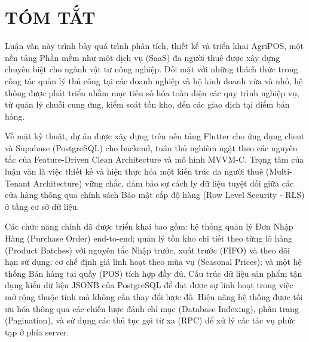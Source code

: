 \documentclass[13pt, a4paper]{report}
\begin{document}
\clearpage
{}






\clearpage
{}
{}
\tableofcontents



\clearpage
{}
{}
\listoffigures %
 


\clearpage
{}
{}
\listoftables %

 



\clearpage
\chapter*{TÓM TẮT}
Luận văn này trình bày quá trình phân tích, thiết kế và triển khai AgriPOS, một nền tảng Phần mềm như một dịch vụ (SaaS) đa người thuê được xây dựng chuyên biệt cho ngành vật tư nông nghiệp. Đối mặt với những thách thức trong công tác quản lý thủ công tại các doanh nghiệp và hộ kinh doanh vừa và nhỏ, hệ thống được phát triển nhằm mục tiêu số hóa toàn diện các quy trình nghiệp vụ, từ quản lý chuỗi cung ứng, kiểm soát tồn kho, đến các giao dịch tại điểm bán hàng.

Về mặt kỹ thuật, dự án được xây dựng trên nền tảng Flutter cho ứng dụng client và Supabase (PostgreSQL) cho backend, tuân thủ nghiêm ngặt theo các nguyên tắc của Feature-Driven Clean Architecture và mô hình MVVM-C. Trọng tâm của luận văn là việc thiết kế và hiện thực hóa một kiến trúc đa người thuê (Multi-Tenant Architecture) vững chắc, đảm bảo sự cách ly dữ liệu tuyệt đối giữa các cửa hàng thông qua chính sách Bảo mật cấp độ hàng (Row Level Security - RLS) ở tầng cơ sở dữ liệu.

Các chức năng chính đã được triển khai bao gồm: hệ thống quản lý Đơn Nhập Hàng (Purchase Order) end-to-end; quản lý tồn kho chi tiết theo từng lô hàng (Product Batches) với nguyên tắc Nhập trước, xuất trước (FIFO) và theo dõi hạn sử dụng; cơ chế định giá linh hoạt theo mùa vụ (Seasonal Prices); và một hệ thống Bán hàng tại quầy (POS) tích hợp đầy đủ. Cấu trúc dữ liệu sản phẩm tận dụng kiểu dữ liệu JSONB của PostgreSQL để đạt được sự linh hoạt trong việc mở rộng thuộc tính mà không cần thay đổi lược đồ. Hiệu năng hệ thống được tối ưu hóa thông qua các chiến lược đánh chỉ mục (Database Indexing), phân trang (Pagination), và sử dụng các thủ tục gọi từ xa (RPC) để xử lý các tác vụ phức tạp ở phía server.
\end{document}
